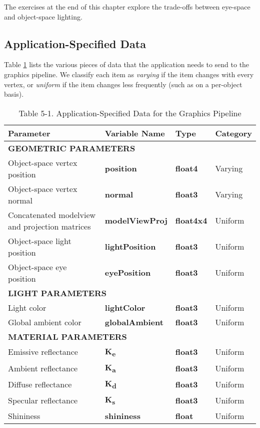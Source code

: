 \documentclass[../main.tex]{subfiles}
\begin{document}
The exercises at the end of this chapter explore the trade-offs between eye-space and object-space lighting.

\subsection*{Application-Specified Data}

Table \ref{table:5-1} lists the various pieces of data that the application needs to send to the graphics pipeline. We classify each item as \textit{varying} if the item changes with every vertex, or \textit{uniform} if the item changes less frequently (such as on a per-object basis).

\begin{table}
\centering
\begin{tabular}{ p{5cm} p{5cm} p{2cm} p{2cm}  } 

Parameter & Variable Name & Type & Category \\
\hline

\multicolumn{4}{p{10cm}}{\textbf{GEOMETRIC PARAMETERS}}\\
	 	 
Object-space vertex position & \textbf{position} & \textbf{float4} & Varying \\
Object-space vertex normal & \textbf{normal} & \textbf{float3} & Varying \\
Concatenated modelview and projection matrices & \textbf{modelViewProj} & \textbf{float4x4} & Uniform \\
Object-space light position & \textbf{lightPosition} & \textbf{float3} & Uniform \\
Object-space eye position & \textbf{eyePosition} & \textbf{float3} & Uniform \\

\hline

\multicolumn{4}{p{10cm}}{\textbf{LIGHT PARAMETERS}}\\
Light color & \textbf{lightColor} & \textbf{float3} & Uniform \\
Global ambient color & \textbf{globalAmbient} & \textbf{float3} & Uniform \\

\hline

\multicolumn{4}{p{10cm}}{\textbf{MATERIAL PARAMETERS}}\\
Emissive reflectance & \textbf{K\textsubscript{e}} & \textbf{float3} & Uniform \\
Ambient reflectance & \textbf{K\textsubscript{a}} & \textbf{float3} & Uniform \\
Diffuse reflectance & \textbf{K\textsubscript{d}} & \textbf{float3} & Uniform \\
Specular reflectance & \textbf{K\textsubscript{s}} & \textbf{float3} & Uniform \\
Shininess & \textbf{shininess} & \textbf{float} & Uniform \\
\hline

\end{tabular}

\caption{Table 5-1. Application-Specified Data for the Graphics Pipeline}
\label{table:5-1}
\end{table}
\end{document}
